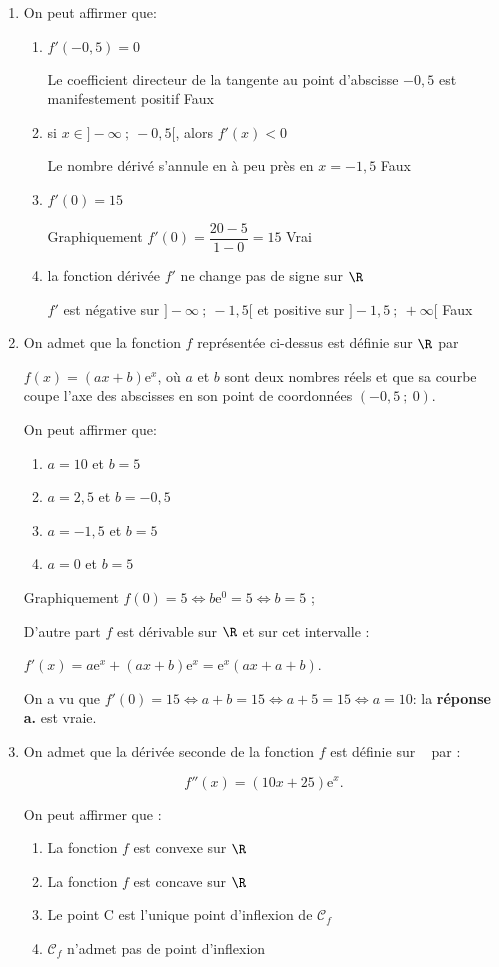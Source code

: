 \begin{enumerate}
\item On peut affirmer que:
	\begin{enumerate}
		\item $f'(-0,5) = 0$ 
		
		Le coefficient directeur de la tangente au point d'abscisse $- 0,5$ est manifestement positif \hfill Faux
		\item si $x \in ]- \infty~;~-0,5[$, alors $f'(x) < 0$ 
		
		Le nombre dérivé s'annule en à peu près en $x = -1,5$ \hfill Faux
		\item $f'(0) = 15$ 
		
		Graphiquement $f'(0) = \dfrac{20 - 5}{1 - 0}= 15$ \hfill Vrai
		\item la fonction dérivée $f'$ ne change pas de signe sur $\R$ 
		
		$f'$ est négative sur $]- \infty~;~- 1,5[$ et positive sur $]- 1,5~;~+ \infty[$ \hfill Faux
	\end{enumerate}
\item On admet que la fonction $f$ représentée ci-dessus est définie sur $\R$ par 

$f(x) = (ax + b)\text{e}^x$, où $a$ et $b$ sont deux nombres réels et que sa courbe coupe l'axe des abscisses en son point de coordonnées $(-0,5~;~ 0)$.

On peut affirmer que:
	\begin{enumerate}
		\item $a = 10$ et $b = 5$ 
		\item $a = 2,5$ et $b = -0,5$ 
		\item $a = -1,5$ et $b = 5$ 
		\item $a = 0$ et $b = 5$
	\end{enumerate}
	
Graphiquement $f(0) = 5 \iff b\text{e}^0 = 5 \iff b = 5$ ;

D'autre part $f$ est dérivable sur $\R$ et sur cet intervalle :

$f'(x) = a\text{e}^x + (ax + b)\text{e}^x = \text{e}^x(ax + a + b)$.

On a vu que $f'(0) = 15 \iff a + b = 15 \iff a + 5 = 15 \iff a = 10$:  la  \textbf{réponse a.} est vraie.
\item On admet que la dérivée seconde de la fonction $f$ est définie sur ~ par : 

\[f''(x) = (10x + 25)\text{e}^x.\]

On peut affirmer que :
	\begin{enumerate}
		\item La fonction $f$ est convexe sur $\R$
		\item La fonction $f$ est concave sur $\R$
		\item Le point C est l'unique point d'inflexion de $\mathcal{C}_f$
		\item $\mathcal{C}_f$ n'admet pas de point d'inflexion
	\end{enumerate}
	

\end{enumerate}
